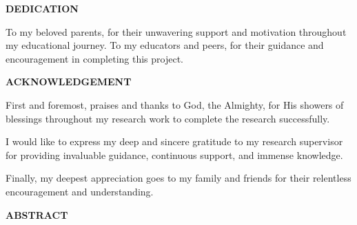 \documentclass[12pt,a4paper]{report}
\begin{document}
\vfill \null
\newpage


\begin{center}
{}
\textbf{DEDICATION}
\end{center}

\vspace{1cm}
To my beloved parents, for their unwavering support and motivation throughout my educational journey. To my educators and peers, for their guidance and encouragement in completing this project.

\vfill \null
\newpage


\begin{center}
{}
\textbf{ACKNOWLEDGEMENT}
\end{center}

\vspace{1cm}
First and foremost, praises and thanks to God, the Almighty, for His showers of blessings throughout my research work to complete the research successfully.

I would like to express my deep and sincere gratitude to my research supervisor for providing invaluable guidance, continuous support, and immense knowledge. 

Finally, my deepest appreciation goes to my family and friends for their relentless encouragement and understanding.

\vfill \null
\newpage


\begin{center}
\vfill \null
{}
{}
\textbf{ABSTRACT}
\end{center}
\end{document}
